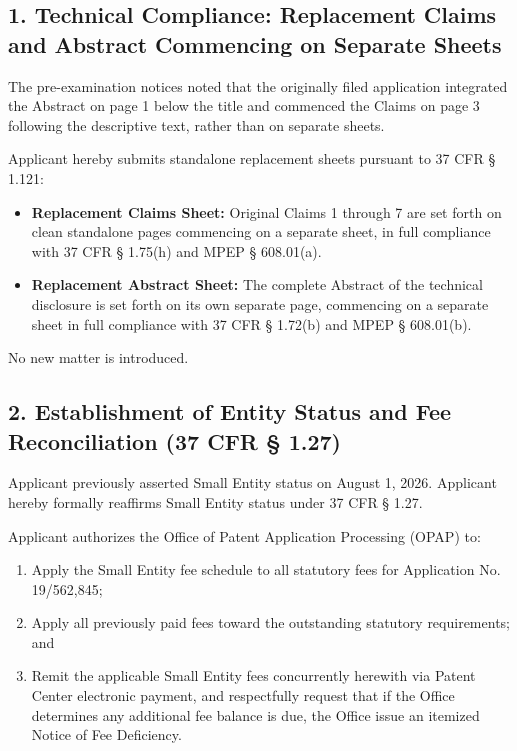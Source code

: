 \documentclass[11pt,letterpaper]{article}
\begin{document}
\subsection*{1. Technical Compliance: Replacement Claims and Abstract Commencing on Separate Sheets}

The pre-examination notices noted that the originally filed application integrated the Abstract on page 1 below the title and commenced the Claims on page 3 following the descriptive text, rather than on separate sheets.

Applicant hereby submits standalone replacement sheets pursuant to 37 CFR \S{} 1.121:
\begin{itemize}[leftmargin=2em, itemsep=2pt, parsep=0pt]
    \item \textbf{Replacement Claims Sheet:} Original Claims 1 through 7 are set forth on clean standalone pages commencing on a separate sheet, in full compliance with 37 CFR \S{} 1.75(h) and MPEP \S{} 608.01(a).
    \item \textbf{Replacement Abstract Sheet:} The complete Abstract of the technical disclosure is set forth on its own separate page, commencing on a separate sheet in full compliance with 37 CFR \S{} 1.72(b) and MPEP \S{} 608.01(b).
\end{itemize}

No new matter is introduced.

\subsection*{2. Establishment of Entity Status and Fee Reconciliation (37 CFR \S{} 1.27)}

Applicant previously asserted Small Entity status on August 1, 2026. Applicant hereby formally reaffirms Small Entity status under 37 CFR \S{} 1.27. 

Applicant authorizes the Office of Patent Application Processing (OPAP) to:
\begin{enumerate}[label=(\alph*), leftmargin=2em, itemsep=2pt, parsep=0pt]
    \item Apply the Small Entity fee schedule to all statutory fees for Application No. 19/562,845;
    \item Apply all previously paid fees toward the outstanding statutory requirements; and
    \item Remit the applicable Small Entity fees concurrently herewith via Patent Center electronic payment, and respectfully request that if the Office determines any additional fee balance is due, the Office issue an itemized Notice of Fee Deficiency.
\end{enumerate}
\end{document}
